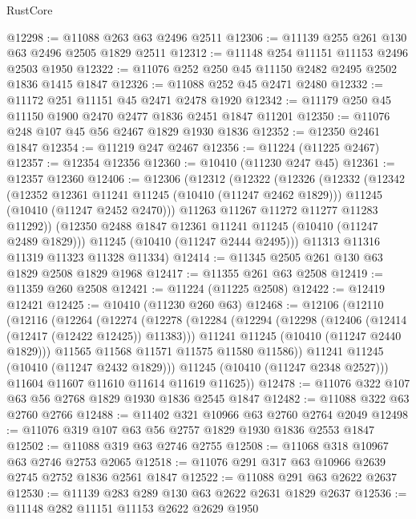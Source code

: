 \begin{lexlean}{RustCore}
\begin{coremodule}
@12298 := @11088 @263 @63 @2496 @2511
@12306 := @11139 @255 @261 @130 @63 @2496 @2505 @1829 @2511
@12312 := @11148 @254 @11151 @11153 @2496 @2503 @1950
@12322 := @11076 @252 @250 @45 @11150 @2482 @2495 @2502 @1836 @1415 @1847
@12326 := @11088 @252 @45 @2471 @2480
@12332 := @11172 @251 @11151 @45 @2471 @2478 @1920
@12342 := @11179 @250 @45 @11150 @1900 @2470 @2477 @1836 @2451 @1847 @11201
@12350 := @11076 @248 @107 @45 @56 @2467 @1829 @1930 @1836
@12352 := @12350 @2461 @1847
@12354 := @11219 @247 @2467
@12356 := @11224 (@11225 @2467)
@12357 := @12354 @12356
@12360 := @10410 (@11230 @247 @45)
@12361 := @12357 @12360
@12406 := @12306
    (@12312
      (@12322
        (@12326
          (@12332
            (@12342
              (@12352 @12361 @11241 @11245 (@10410 (@11247 @2462 @1829)))
              @11245
              (@10410 (@11247 @2452 @2470)))
            @11263
            @11267
            @11272
            @11277
            @11283
            @11292))
        (@12350 @2488 @1847 @12361 @11241 @11245 (@10410 (@11247 @2489 @1829)))
        @11245
        (@10410 (@11247 @2444 @2495)))
      @11313
      @11316
      @11319
      @11323
      @11328
      @11334)
@12414 := @11345 @2505 @261 @130 @63 @1829 @2508 @1829 @1968
@12417 := @11355 @261 @63 @2508
@12419 := @11359 @260 @2508
@12421 := @11224 (@11225 @2508)
@12422 := @12419 @12421
@12425 := @10410 (@11230 @260 @63)
@12468 := @12106
    (@12110
      (@12116
        (@12264
          (@12274
            (@12278
              (@12284
                (@12294
                  (@12298 (@12406 (@12414 (@12417 (@12422 @12425)) @11383)))
                  @11241
                  @11245
                  (@10410 (@11247 @2440 @1829)))
                @11565
                @11568
                @11571
                @11575
                @11580
                @11586))
            @11241
            @11245
            (@10410 (@11247 @2432 @1829)))
          @11245
          (@10410 (@11247 @2348 @2527)))
        @11604
        @11607
        @11610
        @11614
        @11619
        @11625))
@12478 := @11076 @322 @107 @63 @56 @2768 @1829 @1930 @1836 @2545 @1847
@12482 := @11088 @322 @63 @2760 @2766
@12488 := @11402 @321 @10966 @63 @2760 @2764 @2049
@12498 := @11076 @319 @107 @63 @56 @2757 @1829 @1930 @1836 @2553 @1847
@12502 := @11088 @319 @63 @2746 @2755
@12508 := @11068 @318 @10967 @63 @2746 @2753 @2065
@12518 := @11076 @291 @317 @63 @10966 @2639 @2745 @2752 @1836 @2561 @1847
@12522 := @11088 @291 @63 @2622 @2637
@12530 := @11139 @283 @289 @130 @63 @2622 @2631 @1829 @2637
@12536 := @11148 @282 @11151 @11153 @2622 @2629 @1950

\end{coremodule}
\end{lexlean}
